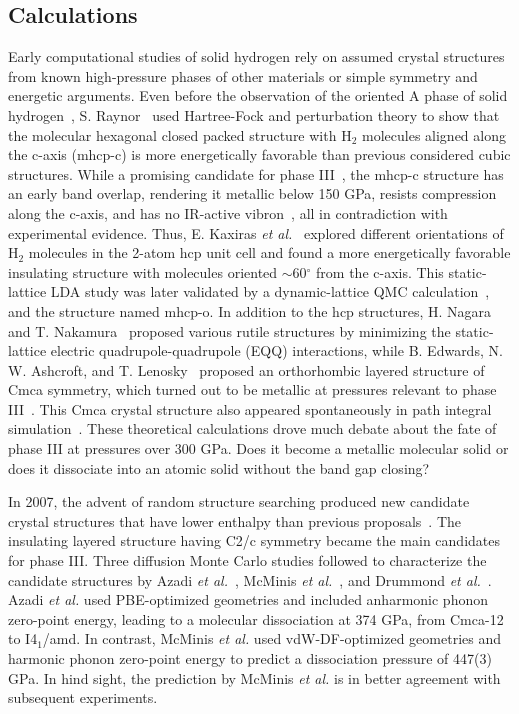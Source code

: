 \subsection{Calculations}
\label{sec:hsolid-calcs}

Early computational studies of solid hydrogen rely on assumed crystal structures from known high-pressure phases of other materials or simple symmetry and energetic arguments. Even before the observation of the oriented A phase of solid hydrogen~\cite{Hemley1988}, S. Raynor~\cite{Raynor1987} used Hartree-Fock and perturbation theory to show that the molecular hexagonal closed packed structure with H$_2$ molecules aligned along the c-axis (mhcp-c) is more energetically favorable than previous considered cubic structures.
While a promising candidate for phase III~\cite{Barbee1989}, the mhcp-c structure has an early band overlap, rendering it metallic below 150 GPa, resists compression along the c-axis, and has no IR-active vibron~\cite{Kaxiras1991,Kaxiras1992}, all in contradiction with experimental evidence.
Thus, E. Kaxiras \textit{et al.}~\cite{Kaxiras1991} explored different orientations of H$_2$ molecules in the 2-atom hcp unit cell and found a more energetically favorable insulating structure with molecules oriented $\sim$60$^{\circ}$ from the c-axis.
This static-lattice LDA study was later validated by a dynamic-lattice QMC calculation~\cite{Natoli1995}, and the structure named mhcp-o.
In addition to the hcp structures, H. Nagara and T. Nakamura~\cite{Nagara1992} proposed various rutile structures by minimizing the static-lattice electric quadrupole-quadrupole (EQQ) interactions, while B. Edwards, N. W. Ashcroft, and T. Lenosky~\cite{Edwards1996} proposed an orthorhombic layered structure of Cmca symmetry, which turned out to be metallic at pressures relevant to phase III~\cite{Johnson2000}.
This Cmca crystal structure also appeared spontaneously in path integral simulation~\cite{Cui2002}.
These theoretical calculations drove much debate about the fate of phase III at pressures over 300 GPa. Does it become a metallic molecular solid or does it dissociate into an atomic solid without the band gap closing?

In 2007, the advent of random structure searching produced new candidate crystal structures that have lower enthalpy than previous proposals~\cite{Pickard2007}. The insulating layered structure having C2/c symmetry became the main candidates for phase III.
Three diffusion Monte Carlo studies followed to characterize the candidate structures by Azadi \textit{et al.}~\cite{Azadi2014}, McMinis \textit{et al.}~\cite{McMinis2015}, and Drummond \textit{et al.}~\cite{Drummond2015}.
Azadi \textit{et al.} used PBE-optimized geometries and included anharmonic phonon zero-point energy, leading to a molecular dissociation at 374 GPa, from Cmca-12 to I4$_1$/amd.
In contrast, McMinis \textit{et al.} used vdW-DF-optimized geometries and harmonic phonon zero-point energy to predict a dissociation pressure of 447(3) GPa.
In hind sight, the prediction by McMinis \textit{et al.} is in better agreement with subsequent experiments.

